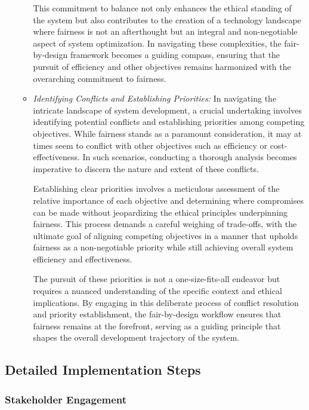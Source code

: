 \begin{enumerate}
\begin{itemize}
            This commitment to balance not only enhances the ethical standing of the system but also contributes to the creation of a technology landscape where fairness is not an afterthought but an integral and non-negotiable aspect of system optimization. In navigating these complexities, the fair-by-design framework becomes a guiding compass, ensuring that the pursuit of efficiency and other objectives remains harmonized with the overarching commitment to fairness.
            
            \item \emph{Identifying Conflicts and Establishing Priorities:} In navigating the intricate landscape of system development, a crucial undertaking involves identifying potential conflicts and establishing priorities among competing objectives. While fairness stands as a paramount consideration, it may at times seem to conflict with other objectives such as efficiency or cost-effectiveness. In such scenarios, conducting a thorough analysis becomes imperative to discern the nature and extent of these conflicts.

            Establishing clear priorities involves a meticulous assessment of the relative importance of each objective and determining where compromises can be made without jeopardizing the ethical principles underpinning fairness. This process demands a careful weighing of trade-offs, with the ultimate goal of aligning competing objectives in a manner that upholds fairness as a non-negotiable priority while still achieving overall system efficiency and effectiveness.
            
            The pursuit of these priorities is not a one-size-fits-all endeavor but requires a nuanced understanding of the specific context and ethical implications. By engaging in this deliberate process of conflict resolution and priority establishment, the fair-by-design workflow ensures that fairness remains at the forefront, serving as a guiding principle that shapes the overall development trajectory of the system.

        \end{itemize}

\end{enumerate}

\subsection{Detailed Implementation Steps}

\subsubsection{Stakeholder Engagement}

